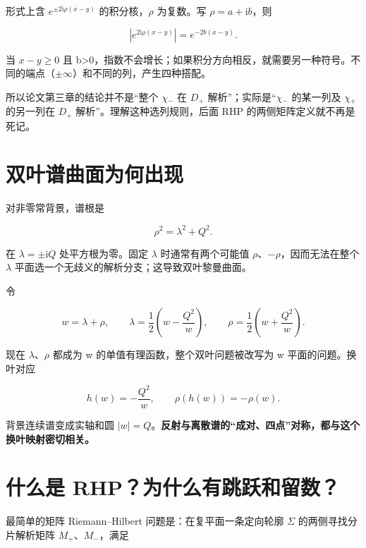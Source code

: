 形式上含 $e^{\pm 2\mathrm{i}\rho(x-y)}$ 的积分核，$\rho{}$ 为复数。写 $\rho{}=a+\mathrm{i}b$，则\par

\[
\left|e^{2\mathrm{i}\rho(x-y)}\right|
=e^{-2b(x-y)}.
\]

当 $x-y\ge{}0$ 且 b>0，指数不会增长；如果积分方向相反，就需要另一种符号。不同的端点（$\pm{}\infty{}$）和不同的列，产生四种搭配。\par

所以论文第三章的结论并不是“整个 $\chi{}_{-}$ 在 $D_{+}$ 解析”；实际是“$\chi{}_{-}$ 的某一列及 $\chi{}_{+}$ 的另一列在 $D_{+}$ 解析”。理解这种选列规则，后面 RHP 的两侧矩阵定义就不再是死记。\par

\section{双叶谱曲面为何出现}

对非零常背景，谱根是\par

\[
\rho^2=\lambda^2+Q^2.
\]

在 $\lambda{}=\pm{}\mathrm{i}Q$ 处平方根为零。固定 $\lambda{}$ 时通常有两个可能值 $\rho{}$、$-\rho{}$，因而无法在整个 $\lambda{}$ 平面选一个无歧义的解析分支；这导致双叶黎曼曲面。\par

令\par

\[
w=\lambda+\rho,
\qquad
\lambda=\dfrac{1}{2}\left(w-\dfrac{Q^2}{w}\right),
\qquad
\rho=\dfrac{1}{2}\left(w+\dfrac{Q^2}{w}\right).
\]

现在 $\lambda{}$、$\rho{}$ 都成为 w 的单值有理函数，整个双叶问题被改写为 w 平面的问题。换叶对应\par

\[
h(w)=-\dfrac{Q^2}{w},
\qquad
\rho(h(w))=-\rho(w).
\]

背景连续谱变成实轴和圆 $|w|=Q$。\textbf{反射与离散谱的“成对、四点”对称，都与这个换叶映射密切相关。}\par

\section{什么是 RHP？为什么有跳跃和留数？}

最简单的矩阵 Riemann–Hilbert 问题是：在复平面一条定向轮廓 $\Sigma{}$ 的两侧寻找分片解析矩阵 $M_{+}$、$M_{-}$，满足\par

